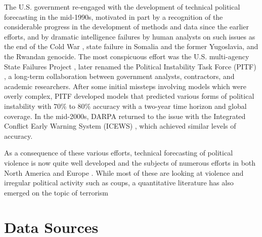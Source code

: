 \documentclass[graybox]{svmult}
\begin{document}
The U.S. government re-engaged with the development of technical political forecasting in the mid-1990s, motivated in part by a recognition of the considerable progress in the development of methods and data since the earlier efforts, and by dramatic intelligence failures by human analysts on such issues as the end of the Cold War \cite{Gadd92a,Gadd92b}, state failure in Somalia and the former Yugoslavia, and the Rwandan genocide. The most conspicuous effort was the U.S. multi-agency State Failures Project \cite{EstyGoldGurr95,EstyGoldGurr98}, later renamed the Political Instability Task Force (PITF) \cite{PITF10}, a long-term collaboration between government analysts, contractors, and academic researchers. After some initial missteps involving models which were overly complex, PITF developed models that predicted various forms of political instability with 70\% to 80\% accuracy with a two-year time horizon and global coverage. In the mid-2000s, DARPA returned to the issue with the Integrated Conflict Early Warning System (ICEWS) \cite{OBrien10} {\color{blue}{[also cite O'Brien's article in this volume]}}, which achieved similar levels of accuracy.

As a consequence of these various efforts,  technical forecasting of political violence is now quite well developed and the subjects of numerous efforts in both North America and Europe \cite{Buhaug2006, BesleyPersson2009, WardGreenhillBakke2010, WeidmannToft2010, BrandtFreemanSchrodt2011, HegreOstbyRaleigh2009, HillBagozziMooreMukherjee2011,Obrien2010, HolmesPineresCurtina2007}. While most of these are looking at violence and irregular political activity such as coups, a quantitative literature has also emerged on the topic of terrorism \cite{DrakosGofas2006jcr, Hultman2007, Li2005,PiazWals09,Piazza08,Piazza11} {\color{blue}{[need to add some Sandler here...do you folks have access to a site where you can get these in BibTeX form? Or is there a good review article somewhere?]}}

{\color{blue}{[Need another sentence or two to finish this off, but probably it is about done]}}


\section{Data Sources}
\label{sec:data}
\end{document}
